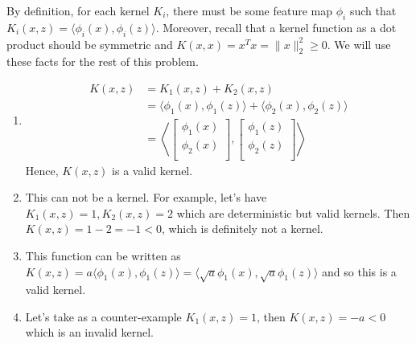 \begin{answer}
By definition, for each kernel $K_i$, there must be some feature map $\phi_i$ 
such that $K_i(x, z) = \langle \phi_i (x), \phi_i (z) \rangle$. Moreover, 
recall that a kernel function as a dot product should be symmetric and $K(x,x) 
= x^{T}x = \|x\|_{2}^{2} \ge 0$. We will use these facts for the rest of this 
problem. 
\begin{enumerate}
\item 
\begin{align}
	K(x, z) 
	&= K_{1}(x, z) + K_{2}(x, z) \\
	&= \langle \phi_{1}(x), \phi_{1}(z) \rangle + \langle \phi_{2}(x), 
	\phi_{2}(z) \rangle \\
	&= \left\langle \begin{bmatrix}
		\phi_{1}(x) \\
		\phi_{2}(x) \\
	\end{bmatrix}, 
	 \begin{bmatrix}
		\phi_{1}(z) \\
		\phi_{2}(z) \\
	\end{bmatrix} \right\rangle
\end{align}
Hence, $K(x,z)$ is a valid kernel.

\item This can not be a kernel. For example, let's have $K_{1}(x,z)=1, K_{2}(x,z)=2$ which are deterministic but valid kernels. Then $K(x,z) = 1-2 = -1 < 0$, which is definitely not a kernel.

\item This function can be written as $K(x,z) = a 
\langle\phi_1(x),\phi_1(z)\rangle = \langle\sqrt{a}\phi_1(x),\sqrt{a}\phi_1(z)\rangle$ 
and so this is a valid kernel.

\item Let's take as a counter-example $K_1(x,z)=1$, then $K(x,z) = -a < 0$ which is an 
invalid kernel. 


\end{enumerate}
\end{answer}
